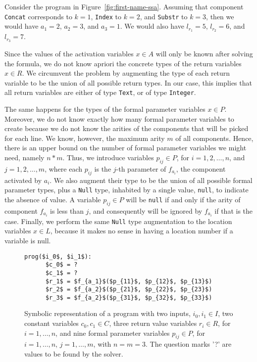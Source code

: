 \begin{example}
  Consider the program in Figure~\ref{fig:first-name-ssa}.
  Assuming that component \lstinline{Concat} corresponds to $k = 1$,
  \lstinline{Index} to $k = 2$, and \lstinline{Substr} to $k = 3$, then we would
  have $a_1 = 2 $, $a_2 = 3$, and $a_3 = 1$.
  We would also have $l_{r_1} = 5$, $l_{r_2} = 6$, and $l_{r_3} = 7$.
\end{example}

Since the values of the activation variables $x \in A$ will only be known after
solving the formula, we do not know apriori the concrete types of the return
variables $x \in R$.
We circumvent the problem by augmenting the type of each return variable to be
the union of all possible return types.
In our case, this implies that all return variables are either of type
\lstinline{Text}, or of type \lstinline{Integer}.

The same happens for the types of the formal parameter variables $x \in P$.
Moreover, we do not know exactly how many formal parameter variables to create
because we do not know the arities of the components that will be picked for
each line.
We know, however, the maximum arity $m$ of all components.
Hence, there is an upper bound on the number of formal parameter variables we
might need, namely $n * m$.
Thus, we introduce variables $p_{ij} \in P$, for $i = 1, 2, \ldots, n$, and
$j = 1, 2, \ldots, m$, where each $p_{ij}$ is the $j$-th parameter of $f_{a_i}$,
the component activated by $a_i$.
We also augment their type to be the union of all possible formal parameter
types, plus a \lstinline{Null} type, inhabited by a single value,
\lstinline{null}, to indicate the absence of value.
A variable $p_{ij} \in P$ will be \lstinline{null} if and only if the arity of
component $f_{a_i}$ is less than $j$, and consequently will be ignored by
$f_{a_i}$ if that is the case.
Finally, we perform the same \lstinline{Null} type augmentation to the location
variables $x \in L$, because it makes no sense in having a location number if a
variable is null.

\begin{figure}
  \begin{lstlisting}[frame=tlrb,mathescape=true]
    prog($i_0$, $i_1$):
      $c_0$ = ?
      $c_1$ = ?
      $r_1$ = $f_{a_1}$($p_{11}$, $p_{12}$, $p_{13}$)
      $r_2$ = $f_{a_2}$($p_{21}$, $p_{22}$, $p_{23}$)
      $r_3$ = $f_{a_2}$($p_{31}$, $p_{32}$, $p_{33}$)
  \end{lstlisting}
\caption{Symbolic representation of a program with two inputs, $i_0, i_1 \in I$,
  two constant variables $c_0, c_1 \in C$, three return value variables $r_i \in
  R$, for $i = 1, \ldots, n$, and nine formal parameter variables $p_{ij} \in
  P$, for $i = 1, \ldots, n$, $j = 1, \ldots, m$, with $n = m = 3$.
  The question marks '?' are values to be found by the solver.}
\label{fig:whole-encoding-prog}
\end{figure}

